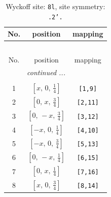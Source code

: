 \documentclass[fleqn,8pt]{jsarticle}
\begin{document}
\begin{longtable}{ccc}
\caption{Wyckoff site: {\tt 8l}, site symmetry: {\tt .2'.}}
 \\
 \hline \hline
No. & position & mapping \\ \hline \endfirsthead

\multicolumn{2}{l}{\tablename\ \thetable{}} \\
 \hline \hline
No. & position & mapping \\ \hline \endhead

 \hline \hline
\multicolumn{2}{r}{\footnotesize\it continued ...} \\ \endfoot

 \hline \hline
\multicolumn{2}{r}{} \\ \endlastfoot

1 & $\left[ x,\, 0,\, \frac{1}{4} \right]$ & {\tt [1,9]} \\ \hline
2 & $\left[ 0,\, x,\, \frac{3}{4} \right]$ & {\tt [2,11]} \\ \hline
3 & $\left[ 0,\, - x,\, \frac{3}{4} \right]$ & {\tt [3,12]} \\ \hline
4 & $\left[ - x,\, 0,\, \frac{1}{4} \right]$ & {\tt [4,10]} \\ \hline
5 & $\left[ - x,\, 0,\, \frac{3}{4} \right]$ & {\tt [5,13]} \\ \hline
6 & $\left[ 0,\, - x,\, \frac{1}{4} \right]$ & {\tt [6,15]} \\ \hline
7 & $\left[ 0,\, x,\, \frac{1}{4} \right]$ & {\tt [7,16]} \\ \hline
8 & $\left[ x,\, 0,\, \frac{3}{4} \right]$ & {\tt [8,14]} \\
\end{longtable}
\renewcommand{\arraystretch}{1.2}
\end{document}
